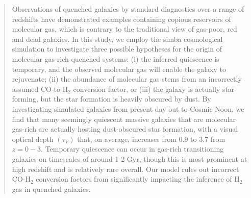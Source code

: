 \documentclass[twocolumn, linenumbers]{aastex631}
\newcommand{\hh}{\text{H}_2}
\newcommand{\simba}[0]{{\sc simba} }
\begin{document}
\author[0000-0002-9729-3721]{Massimiliano Parente}

\author[0000-0003-3256-5615]{Justin Spilker}

\author[0000-0002-1714-1905]{Katherine A. Suess}

\author[0000-0003-0372-5253]{Dariannette Valentin-Martinez}

\author[0009-0008-7017-5742]{Dhruv Zimmerman}

\begin{abstract}
Observations of quenched galaxies by standard diagnostics over a range of redshifts have demonstrated examples containing copious reservoirs of molecular gas, which is contrary to the traditional view of gas-poor, red and dead galaxies.  In this study, we employ the \simba cosmological simulation to investigate three possible hypotheses for the origin of molecular gas-rich quenched systems: (i) the inferred quiescence is temporary, and the observed molecular gas will enable the galaxy to rejuvenate; (ii) the abundance of molecular gas stems from an incorrectly assumed CO-to-H$_2$ conversion factor, or (iii) the galaxy is actually star-forming, but the star formation is heavily obscured by dust.  By investigating simulated galaxies from present day out to Cosmic Noon, we find that many seemingly quiescent massive galaxies that are molecular gas-rich are actually hosting dust-obscured star formation, with a visual optical depth $(\tau_V)$ that, on average, increases from 0.9 to 3.7 from $z=0-3$.  Temporary quiescence can occur in gas-rich transitioning galaxies on timescales of around 1-2 Gyr, though this is most prominent at high redshift and is relatively rare overall.  Our model rules out incorrect CO-H$_2$ conversion factors from significantly impacting the inference of $\hh$ gas in quenched galaxies.
\end{abstract}
\end{document}
